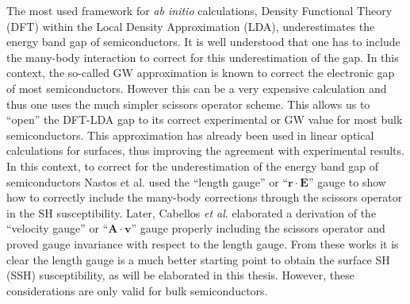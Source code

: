 The most used framework for \emph{ab initio} calculations, Density Functional
Theory (DFT) within the Local Density Approximation (LDA),
\cite{kohnPR65} underestimates the energy band gap of semiconductors. It is well
understood that one has to include the many-body interaction to correct for this
underestimation of the gap. In this context, the so-called GW
approximation\cite{onidaRMP02} is known to correct the electronic gap of most
semiconductors\cite{luceroJPCM12}. However this can be a very expensive
calculation and thus one uses the much simpler scissors operator scheme.
\cite{levinePRL89,levinePRL91,delsolePRB93} This allows us to ``open'' the
DFT-LDA gap to its correct experimental or GW value for most bulk
semiconductors. This approximation has already been used in linear optical
calculations for surfaces,\cite{kippPRL96} thus improving the agreement with
experimental results. In this context, to correct for the underestimation of the
energy band gap of semiconductors Nastos et al.\cite{nastosPRB05} used the
``length gauge'' or ``$\mathbf{r}\cdot\mathbf{E}$'' gauge to show how to
correctly include the many-body corrections through the scissors operator in the
SH susceptibility. Later, Cabellos \textit{et al}.\cite{cabellosPRB09}
elaborated a derivation of the ``velocity gauge'' or
``$\mathbf{A}\cdot\mathbf{v}$'' gauge properly including the scissors operator
and proved gauge invariance with respect to the length gauge. From these works
it is clear the length gauge is a much better starting point to obtain the
surface SH (SSH) susceptibility, as will be elaborated in this thesis. However,
these considerations are only valid for bulk semiconductors.


